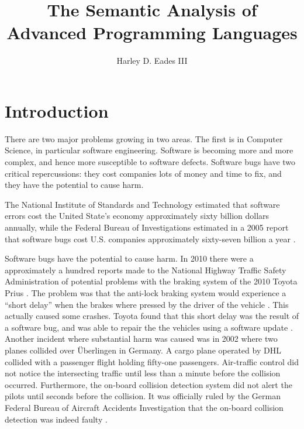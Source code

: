 \documentclass[phd,dedicationpage,ackpage,epigraphpage,figures]{uithesis}
\title{The Semantic Analysis of Advanced Programming Languages}
\author{Harley D. Eades III}
\begin{document}

\frontmatter

\chapter*{\normalfont Introduction \vspace{15px}}
\label{sec:introduction}

There are two major problems growing in two areas.  The first is in
Computer Science, in particular software engineering. Software is
becoming more and more complex, and hence more susceptible to software
defects.  Software bugs have two critical repercussions: they cost
companies lots of money and time to fix, and they have the potential
to cause harm. 

The National Institute of Standards and Technology estimated that
software errors cost the United State's economy approximately sixty
billion dollars annually, while the Federal Bureau of Investigations
estimated in a 2005 report that software bugs cost U.S. companies
approximately sixty-seven billion a year \cite{nist02,fbi05}.

Software bugs have the potential to cause harm.  In 2010 there were a
approximately a hundred reports made to the National Highway Traffic
Safety Administration of potential problems with the braking system of
the 2010 Toyota Prius \cite{Consumer:2010}.  The problem was that the
anti-lock braking system would experience a ``short delay'' when
the brakes where pressed by the driver of the vehicle
\cite{thedetroitbureau.com:2009}.  This actually caused some crashes.
Toyota found that this short delay was the result of a software bug,
and was able to repair the the vehicles using a software update
\cite{Reuters:2009}.  Another incident where substantial harm was
caused was in 2002 where two planes collided over \"{U}berlingen in
Germany. A cargo plane operated by DHL collided with a passenger
flight holding fifty-one passengers.  Air-traffic control did not
notice the intersecting traffic until less than a minute before the
collision occurred.  Furthermore, the on-board collision detection
system did not alert the pilots until seconds before the collision.
It was officially ruled by the German Federal Bureau of Aircraft
Accidents Investigation that the on-board collision detection was
indeed faulty \cite{Collision:2004}.
\end{document}
